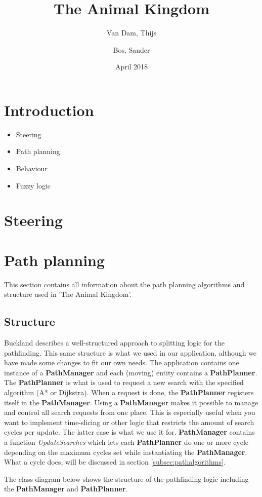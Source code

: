 \documentclass[11pt]{article}
\author{Van Dam, Thijs\\
\and
Bos, Sander\\
}
\title{\huge The Animal Kingdom}
\date{April 2018}
\begin{document}
    \maketitle
    \thispagestyle{empty}
    \newpage
    \newpage
    \setcounter{page}{1}
    \section{Introduction}\label{sec:introduction}
    \begin{itemize}
        \item Steering
        \item Path planning
        \item Behaviour
        \item Fuzzy logic
    \end{itemize}

    \newpage
    \tableofcontents
    \newpage
    \section{Steering}\label{sec:steering}

    \newpage
    \section{Path planning}\label{sec:pathPlanning}
    This section contains all information about the path planning algorithms and structure used in 'The Animal Kingdom'.
    \subsection{Structure}\label{subsec:pathstructure}
    Buckland\cite{pgaie} describes a well-structured approach to splitting logic for the pathfinding.
    This same structure is what we used in our application, although we have made some changes to fit our own needs.
    The application contains one instance of a \textbf{PathManager} and each (moving) entity contains a \textbf{PathPlanner}.
    The \textbf{PathPlanner} is what is used to request a new search with the specified algorithm (A* or Dijkstra).
    When a request is done, the \textbf{PathPlanner} registers itself in the \textbf{PathManager}.
    Using a \textbf{PathManager} makes it possible to manage and control all search requests from one place.
    This is especially useful when you want to implement time-slicing or other logic that restricts the amount of search cycles per update.
    The latter case is what we use it for.
    \textbf{PathManager} contains a function \textit{UpdateSearches} which lets each \textbf{PathPlanner} do one or more cycle depending on the maximum cycles set while instantiating the \textbf{PathManager}.
    What a cycle does, will be discussed in section \ref{subsec:pathalgorithms}.\par
    The class diagram below shows the structure of the pathfinding logic including the \textbf{PathManager} and \textbf{PathPlanner}.
    
\end{document}
